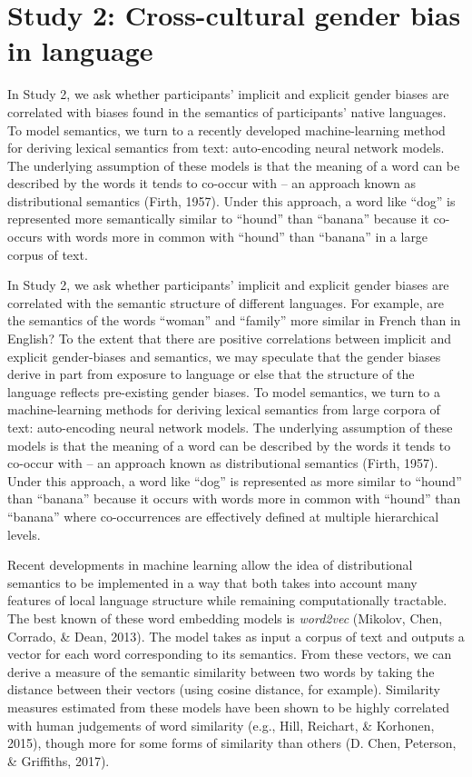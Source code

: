 \documentclass[10pt, letterpaper]{article}
\begin{document}
\section{Study 2: Cross-cultural gender bias in
language}\label{study-2-cross-cultural-gender-bias-in-language}

In Study 2, we ask whether participants' implicit and explicit gender
biases are correlated with biases found in the semantics of
participants' native languages. To model semantics, we turn to a
recently developed machine-learning method for deriving lexical
semantics from text: auto-encoding neural network models. The underlying
assumption of these models is that the meaning of a word can be
described by the words it tends to co-occur with -- an approach known as
distributional semantics (Firth, 1957). Under this approach, a word like
``dog'' is represented more semantically similar to ``hound'' than
``banana'' because it co-occurs with words more in common with ``hound''
than ``banana'' in a large corpus of text.

In Study 2, we ask whether participants' implicit and explicit gender
biases are correlated with the semantic structure of different
languages. For example, are the semantics of the words ``woman'' and
``family'' more similar in French than in English? To the extent that
there are positive correlations between implicit and explicit
gender-biases and semantics, we may speculate that the gender biases
derive in part from exposure to language or else that the structure of
the language reflects pre-existing gender biases. To model semantics, we
turn to a machine-learning methods for deriving lexical semantics from
large corpora of text: auto-encoding neural network models. The
underlying assumption of these models is that the meaning of a word can
be described by the words it tends to co-occur with -- an approach known
as distributional semantics (Firth, 1957). Under this approach, a word
like ``dog'' is represented as more similar to ``hound'' than ``banana''
because it occurs with words more in common with ``hound'' than
``banana'' where co-occurrences are effectively defined at multiple
hierarchical levels.

Recent developments in machine learning allow the idea of distributional
semantics to be implemented in a way that both takes into account many
features of local language structure while remaining computationally
tractable. The best known of these word embedding models is
\emph{word2vec} (Mikolov, Chen, Corrado, \& Dean, 2013). The model takes
as input a corpus of text and outputs a vector for each word
corresponding to its semantics. From these vectors, we can derive a
measure of the semantic similarity between two words by taking the
distance between their vectors (using cosine distance, for example).
Similarity measures estimated from these models have been shown to be
highly correlated with human judgements of word similarity (e.g., Hill,
Reichart, \& Korhonen, 2015), though more for some forms of similarity
than others (D. Chen, Peterson, \& Griffiths, 2017).
\end{document}
